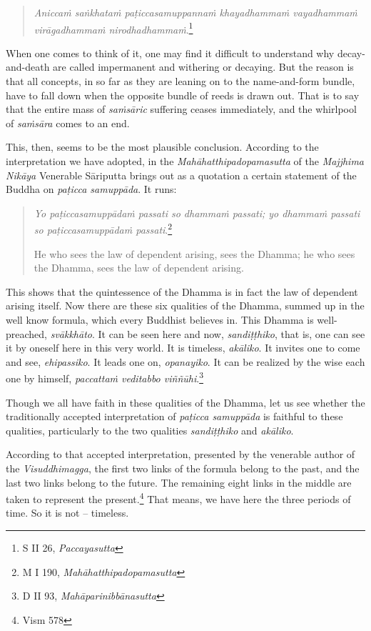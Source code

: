 \begin{quote}
\emph{Aniccaṁ saṅkhataṁ paṭiccasamuppannaṁ khayadhammaṁ vayadhammaṁ virāgadhammaṁ nirodhadhammaṁ}.\footnote{S II 26, \emph{Paccayasutta}}
\end{quote}

When one comes to think of it, one may find it difficult to understand why decay-and-death are called impermanent and withering or decaying. But the reason is that all concepts, in so far as they are leaning on to the name-and-form bundle, have to fall down when the opposite bundle of reeds is drawn out. That is to say that the entire mass of \emph{saṁsāric} suffering ceases immediately, and the whirlpool of \emph{saṁsāra} comes to an end.

This, then, seems to be the most plausible conclusion. According to the interpretation we have adopted, in the \emph{Mahāhatthipadopamasutta} of the \emph{Majjhima Nikāya} Venerable Sāriputta brings out as a quotation a certain statement of the Buddha on \emph{paṭicca samuppāda}. It runs:

\begin{quote}
\emph{Yo paṭiccasamuppādaṁ passati so dhammaṁ passati; yo dhammaṁ passati so paṭiccasamuppādaṁ passati}.\footnote{M I 190, \emph{Mahāhatthipadopamasutta}}

He who sees the law of dependent arising, sees the Dhamma; he who sees the Dhamma, sees the law of dependent arising.
\end{quote}

This shows that the quintessence of the Dhamma is in fact the law of dependent arising itself. Now there are these six qualities of the Dhamma, summed up in the well know formula, which every Buddhist believes in. This Dhamma is well-preached, \emph{svākkhāto}. It can be seen here and now, \emph{sandiṭṭhiko}, that is, one can see it by oneself here in this very world. It is timeless, \emph{akāliko}. It invites one to come and see, \emph{ehipassiko}. It leads one on, \emph{opanayiko}. It can be realized by the wise each one by himself, \emph{paccattaṁ veditabbo viññūhi}.\footnote{D II 93, \emph{Mahāparinibbānasutta}}

Though we all have faith in these qualities of the Dhamma, let us see whether the traditionally accepted interpretation of \emph{paṭicca samuppāda} is faithful to these qualities, particularly to the two qualities \emph{sandiṭṭhiko} and \emph{akāliko}.

According to that accepted interpretation, presented by the venerable author of the \emph{Visuddhimagga}, the first two links of the formula belong to the past, and the last two links belong to the future. The remaining eight links in the middle are taken to represent the present.\footnote{Vism 578} That means, we have here the three periods of time. So it is not -- timeless.

